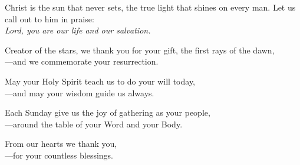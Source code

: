 \intercessions

\begin{raggedright}
Christ is the sun that never sets, the true light that shines on every man. Let us call out to him in praise:\\
\emph{Lord, you are our life and our salvation.}

\medskip
Creator of the stars, we thank you for your gift, the first rays of the dawn,\\
{\color{red}---}and we commemorate your resurrection.

\medskip
May your Holy Spirit teach us to do your will today,\\
{\color{red}---}and may your wisdom guide us always.

\medskip
Each Sunday give us the joy of gathering as your people,\\
{\color{red}---}around the table of your Word and your Body.

\medskip
From our hearts we thank you,\\
{\color{red}---}for your countless blessings.
\end{raggedright}